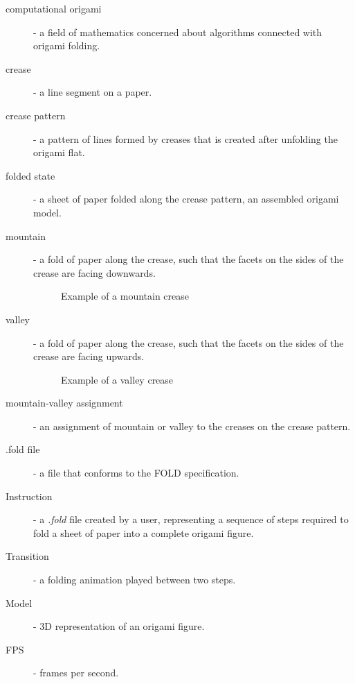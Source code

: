 \begin{description}
	\item[computational origami] \label{dictionary:computational-origami} - a field of mathematics concerned about algorithms connected with origami folding.
	\item[crease] - a line segment on a paper.
	\item[crease pattern] \label{dictionary:crease-pattern} - a pattern of lines formed by creases that is created after unfolding the origami flat.
	\item[folded state] \label{dictionary:folded-state} - a sheet of paper folded along the crease pattern, an assembled origami model.
	\item[mountain] - a fold of paper along the crease, such that the facets on the sides of the crease are facing downwards.
					\begin{figure}[H]
						\caption{Example of a mountain crease}
						\centering
					\end{figure}
	\item[valley] - a fold of paper along the crease, such that the facets on the sides of the crease are facing upwards.
					\begin{figure}[H]
						\caption{Example of a valley crease}
						\centering
					\end{figure}
	\item[mountain-valley assignment] - an assignment of mountain or valley to the creases on the crease pattern.
	\item[.fold file] - a file that conforms to the FOLD\cite{fold:paper} specification.
	\item[Instruction] - a \textit{.fold} file created by a user, representing a sequence of steps required to
		fold a sheet of paper into a complete origami figure.
	\item[Transition] - a folding animation played between two steps.
	\item[Model] - 3D representation of an origami figure. 
	\item[FPS] - frames per second.
\end{description}

